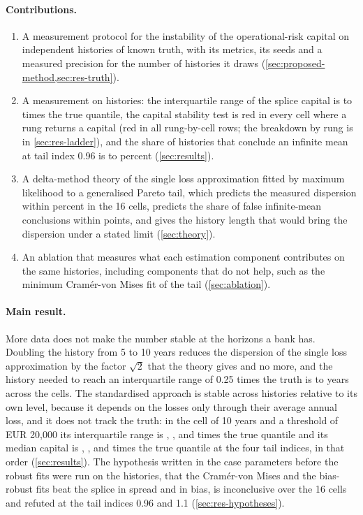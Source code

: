 \paragraph{Contributions.}
\begin{enumerate}
\item A measurement protocol for the instability of the operational-risk capital on independent histories of known truth, with its metrics, its seeds and a measured precision for the number of histories it draws (\cref{sec:proposed-method,sec:res-truth}).
\item A measurement on \nHist{} histories: the interquartile range of the splice capital is \spIqrMin{} to \spIqrMax{} times the true quantile, the capital stability test is red in every cell where a rung returns a capital (red in all \redTotal{} rung-by-cell rows; the breakdown by rung is in \cref{sec:res-ladder}),
and the share of histories that conclude an infinite mean at tail index 0.96 is \infLo{} to \infHi{} percent (\cref{sec:results}).
\item A delta-method theory of the single loss approximation fitted by maximum likelihood to a generalised Pareto tail, which predicts the measured dispersion within \thSdMaxErr{} percent in the 16 cells, predicts the share of false infinite-mean conclusions within \thShareMaxErr{} points, and gives the history length that would bring the dispersion under a stated limit (\cref{sec:theory}).
\item An ablation that measures what each estimation component contributes on the same histories, including components that do not help, such as the minimum Cram\'er-von Mises fit of the tail (\cref{sec:ablation}).
\end{enumerate}

\paragraph{Main result.} More data does not make the number stable at the horizons a bank has. Doubling the history from 5 to 10 years reduces the dispersion of the single loss approximation by the factor $\sqrt2$ that the theory gives and no more, and the history
needed to reach an interquartile range of 0.25 times the truth is \yrsMin{} to \yrsMax{} years across the cells. The standardised approach is stable across histories relative to its own level, because it depends on the losses only through their average annual loss, and it does not track the truth: in the cell of 10 years and a threshold of EUR 20,000 its interquartile range is \smaIqrA{}, \smaIqrB{}, \smaIqrC{} and \smaIqrD{} times the true quantile and its median capital is \smaA{}, \smaB{}, \smaC{} and \smaD{} times the true quantile at the four tail indices, in that order (\cref{sec:results}).
The hypothesis written in the case parameters before the robust fits were run on the histories, that the Cram\'er-von Mises and the bias-robust fits beat the splice in spread and in bias, is inconclusive over the 16 cells and refuted at the tail indices 0.96 and 1.1 (\cref{sec:res-hypotheses}).

